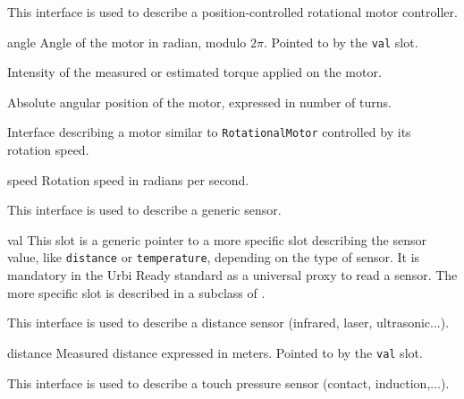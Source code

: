 

This interface is used to describe a position-controlled rotational motor
controller.

\begin{urbiscriptapi}
\item[angle] Angle of the motor in radian, modulo $2\pi$. Pointed to by the
  \lstinline{val} slot.


\item[torque] Intensity of the measured or estimated torque applied on the
  motor.


\item[turn] Absolute angular position of the motor, expressed in number of
  turns.
\end{urbiscriptapi}


Interface describing a motor similar to \lstinline{RotationalMotor}
controlled by its rotation speed.

\begin{urbiscriptapi}
\item[speed] Rotation speed in radians per second.
\end{urbiscriptapi}


This interface is used to describe a generic sensor.

\begin{urbiscriptapi}
\item[val] This slot is a generic pointer to a more specific slot describing
  the sensor value, like \lstinline{distance} or \lstinline{temperature},
  depending on the type of sensor. It is mandatory in the Urbi Ready
  standard as a universal proxy to read a sensor. The more specific slot is
  described in a subclass of .
\end{urbiscriptapi}



This interface is used to describe a distance sensor (infrared, laser,
ultrasonic...).

\begin{urbiscriptapi}
\item[distance] Measured distance expressed in meters.  Pointed to by the
  \lstinline{val} slot.
\end{urbiscriptapi}



This interface is used to describe a touch pressure sensor (contact,
induction,...).

